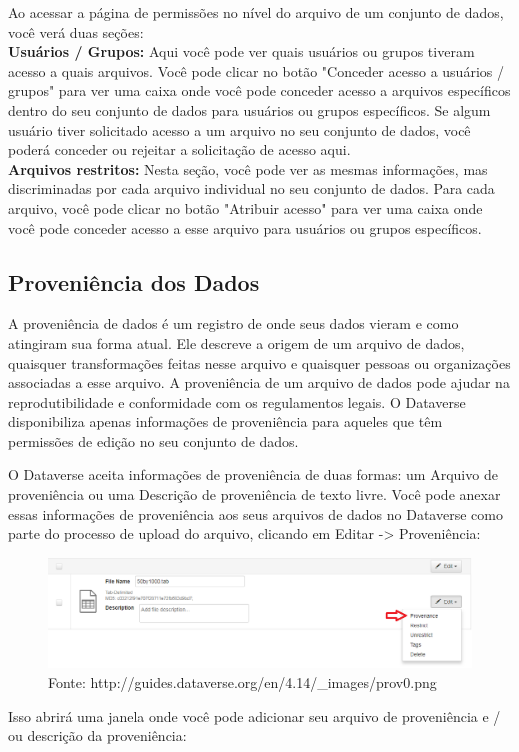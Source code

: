 \documentclass[12pt,hidelinks]{article}
\begin{document}
Ao acessar a página de permissões no nível do arquivo de um conjunto de dados, você verá duas seções:\\

\textbf{Usuários / Grupos:} Aqui você pode ver quais usuários ou grupos tiveram acesso a quais arquivos. Você pode clicar no botão "Conceder acesso a usuários / grupos" para ver uma caixa onde você pode conceder acesso a arquivos específicos dentro do seu conjunto de dados para usuários ou grupos específicos. Se algum usuário tiver solicitado acesso a um arquivo no seu conjunto de dados, você poderá conceder ou rejeitar a solicitação de acesso aqui.\\

\textbf{Arquivos restritos:} Nesta seção, você pode ver as mesmas informações, mas discriminadas por cada arquivo individual no seu conjunto de dados. Para cada arquivo, você pode clicar no botão "Atribuir acesso" para ver uma caixa onde você pode conceder acesso a esse arquivo para usuários ou grupos específicos.
        
    \subsection{Proveniência dos Dados}
    
\qquad A proveniência de dados é um registro de onde seus dados vieram e como atingiram sua forma atual. Ele descreve a origem de um arquivo de dados, quaisquer transformações feitas nesse arquivo e quaisquer pessoas ou organizações associadas a esse arquivo. A proveniência de um arquivo de dados pode ajudar na reprodutibilidade e conformidade com os regulamentos legais. O Dataverse disponibiliza apenas informações de proveniência para aqueles que têm permissões de edição no seu conjunto de dados.

O Dataverse aceita informações de proveniência de duas formas: um Arquivo de proveniência ou uma Descrição de proveniência de texto livre. Você pode anexar essas informações de proveniência aos seus arquivos de dados no Dataverse como parte do processo de upload do arquivo, clicando em Editar -> Proveniência:
   
  \begin{figure}[!htp]
                \centering
                \includegraphics[scale=0.5]{prov.png}
                \caption{Fonte: http://guides.dataverse.org/en/4.14/\_images/prov0.png}
            \label{Proveniência}
        \end{figure}
   \newpage
Isso abrirá uma janela onde você pode adicionar seu arquivo de proveniência e / ou descrição da proveniência:
    
\end{document}
